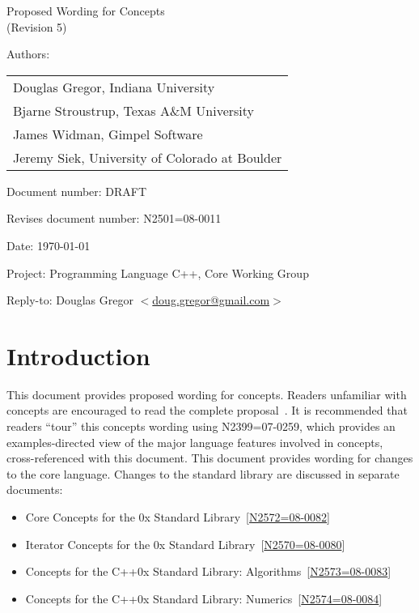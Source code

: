 \documentclass[american]{book}
\begin{document}
\raggedbottom

\begin{titlepage}
\huge
\begin{center}
Proposed Wording for Concepts\\
(Revision 5)
\end{center}

\normalsize
\vspace{0.25in}
\par\noindent Authors: 
\begin{tabular}[t]{l}
Douglas Gregor, Indiana University \\
Bjarne Stroustrup, Texas A\&M University \\
James Widman, Gimpel Software \\
Jeremy Siek, University of Colorado at Boulder
\end{tabular}\vspace{-6pt}

\par\noindent Document number: DRAFT \vspace{-6pt}
\par\noindent Revises document number: N2501=08-0011 \vspace{-6pt}
\par\noindent Date: \today\vspace{-6pt}
\par\noindent Project: Programming Language C++, Core Working Group\vspace{-6pt}
\par\noindent Reply-to: Douglas Gregor $<$\href{mailto:doug.gregor@gmail.com}{doug.gregor@gmail.com}$>$

\section*{Introduction}
This document provides proposed wording for concepts. Readers
unfamiliar with concepts are encouraged to read the complete
proposal~\cite{GregorStroustrup06:concepts_rev_1}. 
%
It is recommended that readers ``tour'' this concepts wording using
N2399=07-0259, which provides an examples-directed view of the major
language features involved in concepts, cross-referenced with this
document.  
%
This document
provides wording for changes to the core language. Changes to the
standard library are discussed in separate documents:

\begin{itemize}
\item Core Concepts for the \Cpp{}0x Standard Library~[\href{http://www.open-std.org/jtc1/sc22/wg21/docs/papers/2008/n2572.pdf}{N2572=08-0082}]
\item Iterator Concepts for the \Cpp{}0x Standard
  Library~[\href{http://www.open-std.org/jtc1/sc22/wg21/docs/papers/2008/n2500.pdf}{N2570=08-0080}]
\item Concepts for the C++0x Standard Library:
  Algorithms~[\href{http://www.open-std.org/jtc1/sc22/wg21/docs/papers/2008/n2573.pdf}{N2573=08-0083}]
\item Concepts for the C++0x Standard Library: Numerics~[\href{http://www.open-std.org/jtc1/sc22/wg21/docs/papers/2008/n2574.pdf}{N2574=08-0084}]
\end{itemize}


\end{titlepage}
\end{document}

